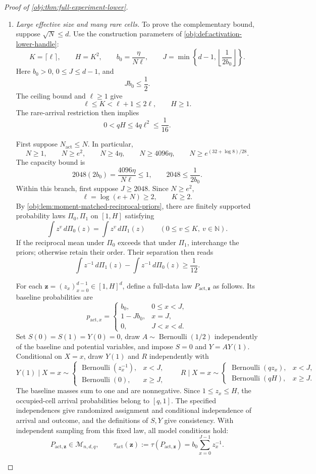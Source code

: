 \begin{proof}[Proof of \cref{obj:thm:full-experiment-lower}]
\begin{enumerate}
\item \emph{Large effective size and many rare cells.}
To prove the complementary bound, suppose \(\sqrt N\le d\).
Use the construction parameters of
\cref{obj:def:activation-lower-handle}:
\[
K=\lceil\ell\rceil,\qquad H=K^2,\qquad
b_0=\frac{\eta}{N\ell},\qquad
J=\min\left\{d-1,\left\lfloor\frac1{2b_0}\right\rfloor\right\}.
\]
Here \(b_0>0\), \(0\le J\le d-1\), and
\[
Jb_0\le\frac12.
\]
The ceiling bound and \(\ell\ge1\) give
\[
\ell\le K<\ell+1\le2\ell,\qquad H\ge1.
\]
The rare-arrival restriction then implies
\[
0<qH\le4q\ell^2\le\frac1{16}.
\]

First suppose \(N_{\mathrm{act}}\le N\). In particular,
\[
N\ge1,\qquad N\ge e^2,\qquad
N\ge4\eta,\qquad N\ge4096\eta,\qquad
N\ge e^{(32+\log8)/28}.
\]
The capacity bound is
\[
2048(2b_0)=\frac{4096\eta}{N\ell}\le1,
\qquad
2048\le\frac1{2b_0}.
\]
Within this branch, first suppose \(J\ge2048\). Since \(N\ge e^2\),
\[
\ell=\log(e+N)\ge2,\qquad K\ge2.
\]
By \cref{obj:lem:moment-matched-reciprocal-priors}, there are finitely
supported probability laws \(\Pi_0,\Pi_1\) on \([1,H]\) satisfying
\[
\int z^v\,d\Pi_0(z)=\int z^v\,d\Pi_1(z)
\qquad(0\le v\le K,\ v\in\mathbb N).
\]
If the reciprocal mean under \(\Pi_0\) exceeds that under \(\Pi_1\), interchange
the priors; otherwise retain their order. Their separation then reads
\[
\int z^{-1}\,d\Pi_1(z)-\int z^{-1}\,d\Pi_0(z)
\ge\frac1{12}.
\]

For each \(\mathbf z=(z_x)_{x=0}^{d-1}\in[1,H]^d\), define a full-data law
\(P_{\mathrm{act},\mathbf z}\) as follows. Its baseline probabilities are
\[
p_{\mathrm{act},x}=
\begin{cases}
b_0,&0\le x<J,\\
1-Jb_0,&x=J,\\
0,&J<x<d.
\end{cases}
\]
Set \(S(0)=S(1)=Y(0)=0\), draw \(A\sim\operatorname{Bernoulli}(1/2)\)
independently of the baseline and potential variables, and impose \(S=0\) and
\(Y=AY(1)\). Conditional on \(X=x\), draw \(Y(1)\) and \(R\) independently with
\[
Y(1)\mid X=x\sim
\begin{cases}
\operatorname{Bernoulli}(z_x^{-1}),&x<J,\\
\operatorname{Bernoulli}(0),&x\ge J,
\end{cases}
\qquad
R\mid X=x\sim
\begin{cases}
\operatorname{Bernoulli}(qz_x),&x<J,\\
\operatorname{Bernoulli}(qH),&x\ge J.
\end{cases}
\]
The baseline masses sum to one and are nonnegative. Since \(1\le z_x\le H\),
the occupied-cell arrival probabilities belong to \([q,1]\). The specified
independences give randomized assignment and conditional independence of
arrival and outcome, and the definitions of \(S,Y\) give consistency.
With independent sampling from this fixed law, all model conditions hold:
\[
P_{\mathrm{act},\mathbf z}\in\mathcal M_{n,d,q},
\qquad
\tau_{\mathrm{act}}(\mathbf z)
:=\tau(P_{\mathrm{act},\mathbf z})
=b_0\sum_{x=0}^{J-1}z_x^{-1}.
\]


\end{enumerate}
\end{proof}

